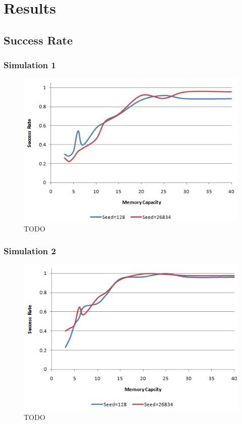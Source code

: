 \chapter{Results}

\section{Success Rate}

\subsection{Simulation 1}

\begin{figure}[h!]
    \centering
    \includegraphics[width=.9\textwidth]{images/result_sccess_sim1byseed_dss}
    \caption{TODO}
\end{figure}

\subsection{Simulation 2}

\begin{figure}[h!]
    \centering
    \includegraphics[width=.9\textwidth]{images/result_sccess_sim2byseed_dss}
    \caption{TODO}
\end{figure}

